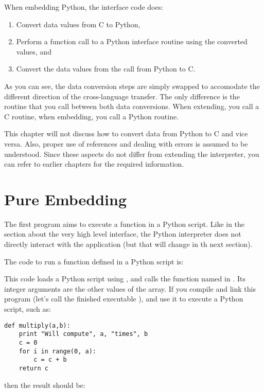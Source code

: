 When embedding Python, the interface code does:

\begin{enumerate}
    \item Convert data values from C to Python,
    \item Perform a function call to a Python interface routine
        using the converted values, and
    \item Convert the data values from the call from Python to C.
\end{enumerate}

As you can see, the data conversion steps are simply swapped to
accomodate the different direction of the cross-language transfer.
The only difference is the routine that you call between both
data conversions. When extending, you call a C routine, when
embedding, you call a Python routine.

This chapter will not discuss how to convert data from Python
to C and vice versa.  Also, proper use of references and dealing
with errors is assumed to be understood.  Since these aspects do not
differ from extending the interpreter, you can refer to earlier
chapters for the required information.


\section{Pure Embedding
         \label{pure-embedding}}

The first program aims to execute a function in a Python
script. Like in the section about the very high level interface,
the Python interpreter does not directly interact with the
application (but that will change in th next section).

The code to run a function defined in a Python script is:



This code loads a Python script using , and calls the
function named in .  Its integer arguments are the other
values of the  array.  If you compile and link this
program (let's call the finished executable ), and use
it to execute a Python script, such as:

\begin{verbatim}
def multiply(a,b):
    print "Will compute", a, "times", b
    c = 0
    for i in range(0, a):
        c = c + b
    return c
\end{verbatim}

then the result should be:

